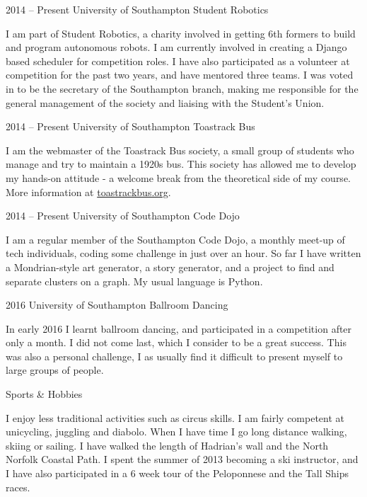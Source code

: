 \documentclass{tccv}
\begin{document}
\begin{eventlist}

    \item{2014 -- Present}
         {University of Southampton}
         {Student Robotics}
    
    I am part of Student Robotics, a charity involved in getting 6th formers to build and program autonomous robots. I am currently involved in creating a Django based scheduler for competition roles. I have also participated as a volunteer at competition for the past two years, and have mentored three teams. I was voted in to be the secretary of the Southampton branch, making me responsible for the general management of the society and liaising with the Student's Union.
    
    \item{2014 -- Present}
         {University of Southampton}
         {Toastrack Bus}
         
    I am the webmaster of the Toastrack Bus society, a small group of students who manage and try to maintain a 1920s bus. This society has allowed me to develop my hands-on attitude - a welcome break from the theoretical side of my course. More information at \href{http://toastrackbus.org}{toastrackbus.org}.
    
    \item{2014 -- Present}
         {University of Southampton}
         {Code Dojo}
    
    I am a regular member of the Southampton Code Dojo, a monthly meet-up of tech individuals, coding some challenge in just over an hour. So far I have written a Mondrian-style art generator, a story generator, and a project to find and separate clusters on a graph. My usual language is Python. 
    
    \item{2016}
         {University of Southampton}
         {Ballroom Dancing}
         
    In early 2016 I learnt ballroom dancing, and participated in a competition after only a month. I did not come last, which I consider to be a great success. This was also a personal challenge, I as usually find it difficult to present myself to large groups of people.
         
    
    \item{}
         {}
         {Sports \& Hobbies}
    
    I enjoy less traditional activities such as circus skills. I am fairly competent at unicycling, juggling and diabolo. When I have time I go long distance walking, skiing or sailing. I have walked the length of Hadrian's wall and the North Norfolk Coastal Path. I spent the summer of 2013 becoming a ski instructor, and I have also participated in a 6 week tour of the Peloponnese and the Tall Ships races.

\end{eventlist}
\end{document}
